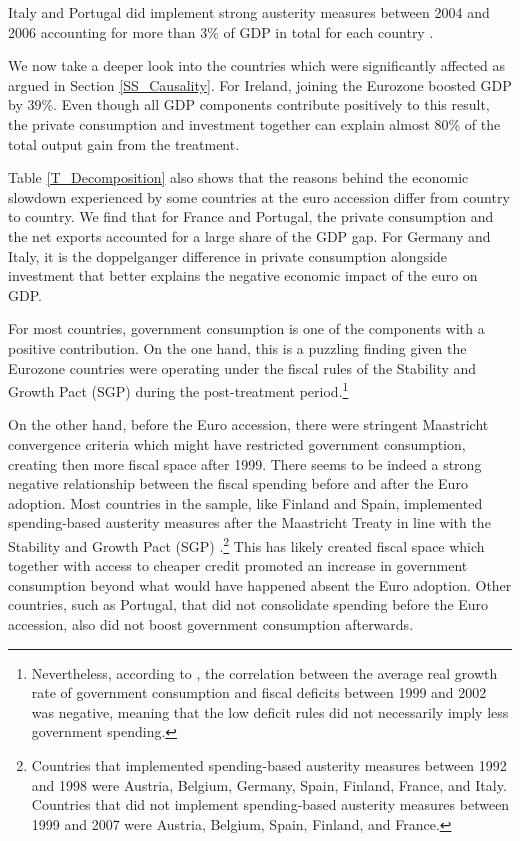 \documentclass[12pt]{article}
\begin{document}
Italy and Portugal did implement strong austerity measures between 2004 and 2006 accounting for more than 3\% of GDP in total for each country \cite{Alesina2019}.

We now take a deeper look into the countries which were significantly affected as argued in Section \ref{SS_Causality}. For Ireland, joining the Eurozone boosted GDP by 39\%. Even though all GDP components contribute positively to this result, the private consumption and investment together can explain almost 80\% of the total output gain from the treatment.

Table \ref{T_Decomposition} also shows that the reasons behind the economic slowdown experienced by some countries at the euro accession differ from country to country. We find that for France and Portugal, the private consumption and the net exports accounted for a large share of the GDP gap. For Germany and Italy, it is the doppelganger difference in private consumption alongside investment that better explains the negative economic impact of the euro on GDP.

For most countries, government consumption is one of the components with a positive contribution. On the one hand, this is a puzzling finding given the Eurozone countries were operating under the fiscal rules of the Stability and Growth Pact (SGP) during the post-treatment period.\footnote{Nevertheless, according to \cite{Bofinger2003}, the correlation between the average real growth rate of government consumption and fiscal deficits between 1999 and 2002 was negative, meaning that the low deficit rules did not necessarily imply less government spending.} 

On the other hand, before the Euro accession, there were stringent Maastricht convergence criteria which might have restricted government consumption, creating then more fiscal space after 1999. There seems to be indeed a strong negative relationship between the fiscal spending before and after the Euro adoption. Most countries in the sample, like Finland and Spain, implemented spending-based austerity measures after the Maastricht Treaty in line with the Stability and Growth Pact (SGP) \citep{Alesina2019}.\footnote{Countries that implemented spending-based austerity measures between 1992 and 1998 were Austria, Belgium, Germany, Spain, Finland, France, and Italy. Countries that did not implement spending-based austerity measures between 1999 and 2007 were Austria, Belgium, Spain, Finland, and France.} This has likely created fiscal space which together with access to cheaper credit promoted an increase in government consumption beyond what would have happened absent the Euro adoption. Other countries, such as Portugal, that did not consolidate spending before the Euro accession, also did not boost government consumption afterwards. 
\end{document}
